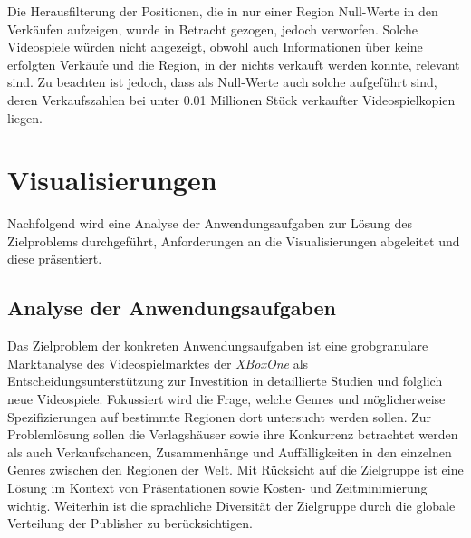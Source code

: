 \documentclass[usegeometry=true]{scrartcl}
\begin{document}
Die Herausfilterung der Positionen, die in nur einer Region Null-Werte in den Verkäufen aufzeigen, wurde in Betracht gezogen, jedoch verworfen.
Solche Videospiele würden nicht angezeigt, obwohl auch Informationen über keine erfolgten Verkäufe und die Region, in der nichts verkauft werden konnte, relevant sind. 
Zu beachten ist jedoch, dass als Null-Werte auch solche aufgeführt sind, deren Verkaufszahlen bei unter 0.01 Millionen Stück verkaufter Videospielkopien liegen. 

\section{Visualisierungen}
Nachfolgend wird eine Analyse der Anwendungsaufgaben zur Lösung des Zielproblems durchgeführt, Anforderungen an die Visualisierungen abgeleitet und diese präsentiert.

\subsection{Analyse der Anwendungsaufgaben}
Das Zielproblem der konkreten Anwendungsaufgaben ist eine grobgranulare Marktanalyse des Videospielmarktes der \textit{XBoxOne} 
als Entscheidungsunterstützung zur Investition in detaillierte Studien und folglich neue Videospiele. 
Fokussiert wird die Frage, welche Genres und möglicherweise Spezifizierungen auf bestimmte Regionen dort untersucht werden sollen. 
Zur Problemlösung sollen die Verlagshäuser sowie ihre Konkurrenz betrachtet werden als auch Verkaufschancen, Zusammenhänge und Auffälligkeiten in den einzelnen Genres zwischen den Regionen der Welt. 
Mit Rücksicht auf die Zielgruppe ist eine Lösung im Kontext von Präsentationen sowie Kosten- und Zeitminimierung wichtig. 
Weiterhin ist die sprachliche Diversität der Zielgruppe durch die globale Verteilung der Publisher zu berücksichtigen.
\end{document}
